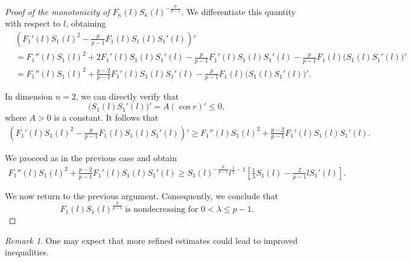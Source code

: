 \documentclass[11pt]{article}
\numberwithin{equation}{section}
\theoremstyle{definition}
\theoremstyle{remark}
\newtheorem{remark}[theorem]{Remark}
\begin{document}
\begin{proof}[Proof of the monotonicity of $F_\kappa(l)S_\kappa(l)^{-\frac{p}{p-1}}$]
We differentiate this quantity with respect to $l$, obtaining
\begin{align*}
&\left(F_1'(l)S_1(l)^2
-\frac{p}{p-1}F_1(l)S_1(l)S_1'(l)\right)' \\
&=
F_1''(l)S_1(l)^2
+2F_1'(l)S_1(l)S_1'(l)
-\frac{p}{p-1}F_1'(l)S_1(l)S_1'(l)
-\frac{p}{p-1}F_1(l)\big(S_1(l)S_1'(l)\big)' \\
&=
F_1''(l)S_1(l)^2
+\frac{p-2}{p-1}F_1'(l)S_1(l)S_1'(l)
-\frac{p}{p-1}F_1(l)\big(S_1(l)S_1'(l)\big)'.
\end{align*}

In dimension $n=2$, we can directly verify that
\[
\big(S_1(l)S_1'(l)\big)' = A(\cos r)' \le 0,
\]
where $A>0$ is a constant.
It follows that
\begin{align*}
\left(F_1'(l)S_1(l)^2
-\frac{p}{p-1}F_1(l)S_1(l)S_1'(l)\right)'
\ge
F_1''(l)S_1(l)^2
+\frac{p-2}{p-1}F_1'(l)S_1(l)S_1'(l).
\end{align*}

We proceed as in the previous case and obtain
\begin{align*}
F_1''(l)S_1(l)^2
+\frac{p-2}{p-1}F_1'(l)S_1(l)S_1'(l)
\ge
S_1(l)^{-\frac{p}{p-1}} l^{\frac{1}{\lambda}-1}
\left[
\frac{1}{\lambda}S_1(l)
-\frac{2}{p-1}lS_1'(l)
\right].
\end{align*}

We now return to the previous argument. Consequently, we conclude that
\[
F_1(l)S_1(l)^{\frac{p}{p-1}}
\ \text{is nondecreasing for } 0<\lambda\le p-1.
\]
\end{proof}
\begin{remark}
One may expect that more refined estimates could lead to improved inequalities.
\end{remark}


\end{document}
